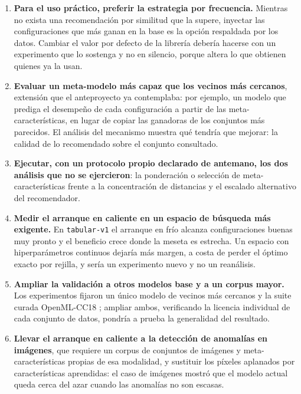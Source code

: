 \documentclass[12pt,letterpaper,oneside]{article}
\begin{document}
\begin{enumerate}
  \item \textbf{Para el uso práctico, preferir la estrategia por frecuencia.} Mientras no
        exista una recomendación por similitud que la supere, inyectar las configuraciones
        que más ganan en la base es la opción respaldada por los datos. Cambiar el valor por
        defecto de la librería debería hacerse con un experimento que lo sostenga y no en
        silencio, porque altera lo que obtienen quienes ya la usan.

  \item \textbf{Evaluar un meta-modelo más capaz que los vecinos más cercanos}, extensión que
        el anteproyecto ya contemplaba: por ejemplo, un modelo que prediga el desempeño de
        cada configuración a partir de las meta-características, en lugar de copiar las
        ganadoras de los conjuntos más parecidos. El análisis del mecanismo muestra qué
        tendría que mejorar: la calidad de lo recomendado sobre el conjunto consultado.

  \item \textbf{Ejecutar, con un protocolo propio declarado de antemano, los dos análisis
        que no se ejercieron}: la ponderación o selección de meta-características frente a
        la concentración de distancias y el escalado alternativo del recomendador.

  \item \textbf{Medir el arranque en caliente en un espacio de búsqueda más exigente.} En
        \texttt{tabular-v1} el arranque en frío alcanza configuraciones buenas muy pronto y
        el beneficio crece donde la meseta es estrecha. Un espacio con hiperparámetros
        continuos dejaría más margen, a costa de perder el óptimo exacto por rejilla, y
        sería un experimento nuevo y no un reanálisis.

  \item \textbf{Ampliar la validación a otros modelos base y a un corpus mayor.} Los
        experimentos fijaron un único modelo de vecinos más cercanos y la suite curada
        OpenML-CC18 \cite{openml-cc18}; ampliar ambos, verificando la licencia individual de
        cada conjunto de datos, pondría a prueba la generalidad del resultado.

  \item \textbf{Llevar el arranque en caliente a la detección de anomalías en imágenes}, que
        requiere un corpus de conjuntos de imágenes y meta-características propias de esa
        modalidad, y sustituir los píxeles aplanados por características aprendidas: el caso
        de imágenes mostró que el modelo actual queda cerca del azar cuando las anomalías no
        son escasas.


\end{enumerate}
\end{document}
